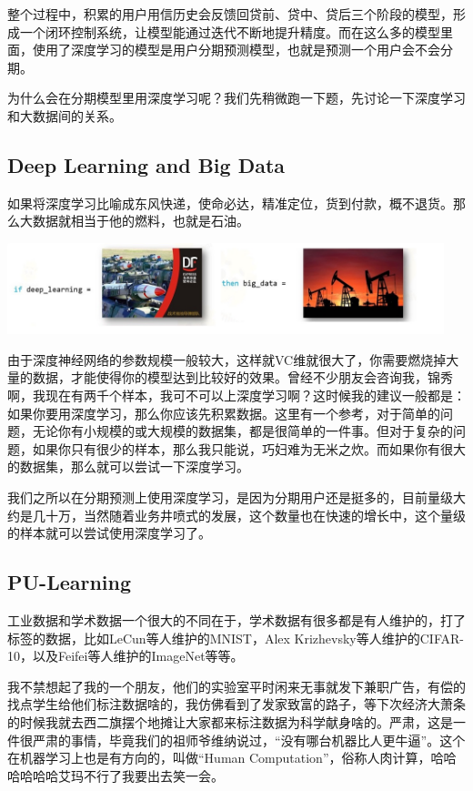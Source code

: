 \documentclass{article}
\begin{document}
整个过程中，积累的用户用信历史会反馈回贷前、贷中、贷后三个阶段的模型，形成一个闭环控制系统，让模型能通过迭代不断地提升精度。而在这么多的模型里面，使用了深度学习的模型是用户分期预测模型，也就是预测一个用户会不会分期。

为什么会在分期模型里用深度学习呢？我们先稍微跑一下题，先讨论一下深度学习和大数据间的关系。
\subsection{Deep Learning and Big Data}
如果将深度学习比喻成东风快递，使命必达，精准定位，货到付款，概不退货。那么大数据就相当于他的燃料，也就是石油。

\begin{center}
\includegraphics[width=5in]{image/image25.jpg}
\end{center}

由于深度神经网络的参数规模一般较大，这样就VC维就很大了，你需要燃烧掉大量的数据，才能使得你的模型达到比较好的效果。曾经不少朋友会咨询我，锦秀啊，我现在有两千个样本，我可不可以上深度学习啊？这时候我的建议一般都是：如果你要用深度学习，那么你应该先积累数据。这里有一个参考，对于简单的问题，无论你有小规模的或大规模的数据集，都是很简单的一件事。但对于复杂的问题，如果你只有很少的样本，那么我只能说，巧妇难为无米之炊。而如果你有很大的数据集，那么就可以尝试一下深度学习。



我们之所以在分期预测上使用深度学习，是因为分期用户还是挺多的，目前量级大约是几十万，当然随着业务井喷式的发展，这个数量也在快速的增长中，这个量级的样本就可以尝试使用深度学习了。

\subsection{PU-Learning}
工业数据和学术数据一个很大的不同在于，学术数据有很多都是有人维护的，打了标签的数据，比如LeCun等人维护的MNIST，Alex Krizhevsky等人维护的CIFAR-10，以及Feifei等人维护的ImageNet等等。

我不禁想起了我的一个朋友，他们的实验室平时闲来无事就发下兼职广告，有偿的找点学生给他们标注数据啥的，我仿佛看到了发家致富的路子，等下次经济大萧条的时候我就去西二旗摆个地摊让大家都来标注数据为科学献身啥的。严肃，这是一件很严肃的事情，毕竟我们的祖师爷维纳说过，“没有哪台机器比人更牛逼”。这个在机器学习上也是有方向的，叫做“Human Computation”，俗称人肉计算，哈哈哈哈哈哈艾玛不行了我要出去笑一会。
\end{document}
